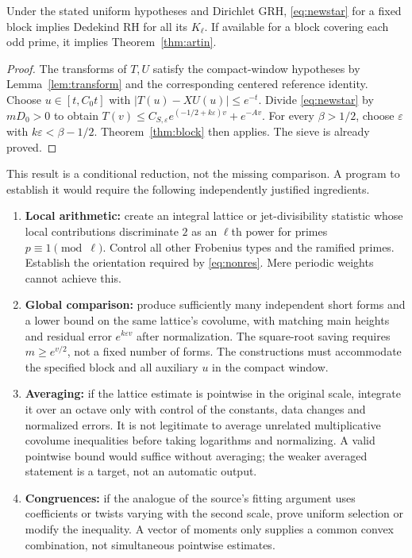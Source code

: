 \documentclass[11pt,letterpaper]{article}
\theoremstyle{definition}\newtheorem{definition}[theorem]{Definition}
\theoremstyle{remark}\newtheorem{remark}[theorem]{Remark}
\begin{document}
\begin{proposition}\label{prop:bridge}
Under the stated uniform hypotheses and Dirichlet GRH, \eqref{eq:newstar} for a fixed block implies Dedekind RH for all its $K_\ell$. If available for a block covering each odd prime, it implies Theorem~\ref{thm:artin}.
\end{proposition}
\begin{proof}
The transforms of $T,U$ satisfy the compact-window hypotheses by Lemma~\ref{lem:transform} and the corresponding centered reference identity. Choose $u\in[t,C_0t]$ with $|T(u)-XU(u)|\le e^{-t}$. Divide \eqref{eq:newstar} by $mD_0>0$ to obtain $T(v)\le C_{S,\varepsilon}e^{(-1/2+k\varepsilon)v}+e^{-Av}$. For every $\beta>1/2$, choose $\varepsilon$ with $k\varepsilon<\beta-1/2$. Theorem~\ref{thm:block} then applies. The sieve is already proved.
\end{proof}
This result is a conditional reduction, not the missing comparison. A program to establish it would require the following independently justified ingredients.
\begin{enumerate}
\item \textbf{Local arithmetic:} create an integral lattice or jet-divisibility statistic whose local contributions discriminate $2$ as an $\ell$th power for primes $p\equiv1\pmod\ell$. Control all other Frobenius types and the ramified primes. Establish the orientation required by \eqref{eq:nonres}. Mere periodic weights cannot achieve this.
\item \textbf{Global comparison:} produce sufficiently many independent short forms and a lower bound on the same lattice's covolume, with matching main heights and residual error $e^{k\varepsilon v}$ after normalization. The square-root saving requires $m\ge e^{v/2}$, not a fixed number of forms. The constructions must accommodate the specified block and all auxiliary $u$ in the compact window.
\item \textbf{Averaging:} if the lattice estimate is pointwise in the original scale, integrate it over an octave only with control of the constants, data changes and normalized errors. It is not legitimate to average unrelated multiplicative covolume inequalities before taking logarithms and normalizing. A valid pointwise bound would suffice without averaging; the weaker averaged statement is a target, not an automatic output.
\item \textbf{Congruences:} if the analogue of the source's fitting argument uses coefficients or twists varying with the second scale, prove uniform selection or modify the inequality. A vector of moments only supplies a common convex combination, not simultaneous pointwise estimates.
\end{enumerate}
\end{document}
